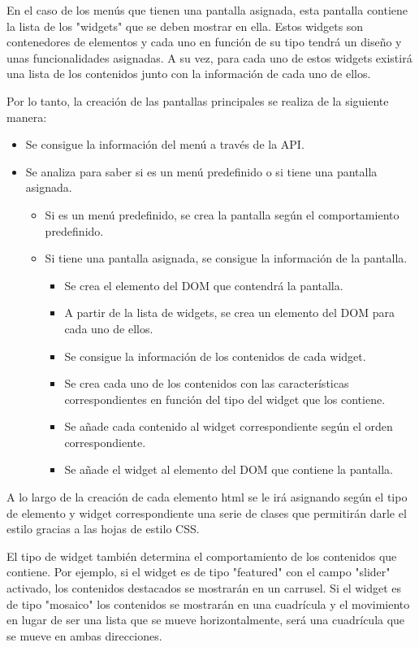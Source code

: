 En el caso de los menús que tienen una pantalla asignada, esta pantalla contiene la lista de los "widgets" que se deben mostrar en ella. Estos widgets son contenedores
de elementos y cada uno en función de su tipo tendrá un diseño y unas funcionalidades asignadas. A su vez, para cada uno de estos widgets existirá una lista de los contenidos
junto con la información de cada uno de ellos. 

Por lo tanto, la creación de las pantallas principales se realiza de la siguiente manera:

\begin{itemize}
    \item Se consigue la información del menú a través de la API.
    \item Se analiza para saber si es un menú predefinido o si tiene una pantalla asignada. \begin{itemize}
        \item Si es un menú predefinido, se crea la pantalla según el comportamiento predefinido.
        \item Si tiene una pantalla asignada, se consigue la información de la pantalla. \begin{itemize}
            \item Se crea el elemento del DOM que contendrá la pantalla.
            \item A partir de la lista de widgets, se crea un elemento del DOM para cada uno de ellos.
            \item Se consigue la información de los contenidos de cada widget.
            \item Se crea cada uno de los contenidos con las características correspondientes en función del tipo del widget que los contiene.
            \item Se añade cada contenido al widget correspondiente según el orden correspondiente.
            \item Se añade el widget al elemento del DOM que contiene la pantalla.
        \end{itemize}
    \end{itemize}
\end{itemize}

A lo largo de la creación de cada elemento html se le irá asignando según el tipo de elemento y widget correspondiente una serie de clases que permitirán
darle el estilo gracias a las hojas de estilo CSS.

El tipo de widget también determina el comportamiento de los contenidos que contiene. Por ejemplo, si el widget es de tipo "featured" con el campo "slider" activado, 
los contenidos destacados se mostrarán en un carrusel. Si el widget es de tipo "mosaico" los contenidos se mostrarán en una cuadrícula y el movimiento en 
lugar de ser una lista que se mueve horizontalmente, será una cuadrícula que se mueve en ambas direcciones.

